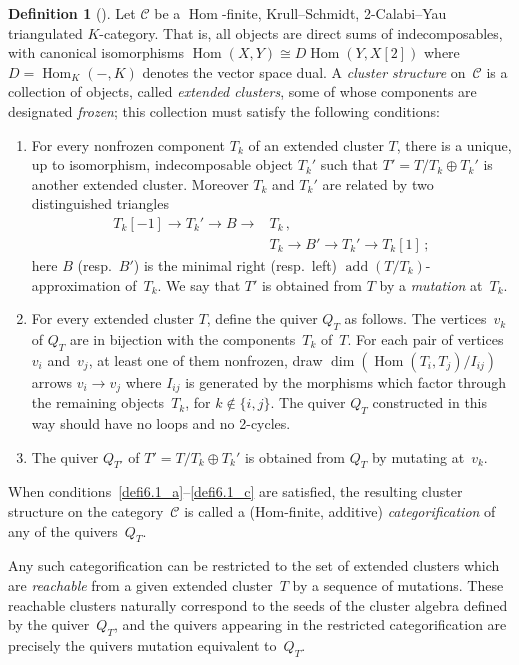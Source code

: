 \documentclass[10pt]{amsart}
\theoremstyle{definition}
\newtheorem{definition}[theorem]{Definition}
\DeclareMathOperator{\Hom}{Hom}
\DeclareMathOperator{\add}{add}
\begin{document}
\begin{definition}[{\cite[Section~II.1]{BIRSc}}]
\label{def:BIRSc}
Let $\mathcal C$ be a $\Hom$-finite, Krull--Schmidt, 2-Calabi--Yau triangulated $K$-category. 
That is, all objects are direct sums of indecomposables, with canonical isomorphisms 
$\Hom(X,Y)\cong D\!\Hom (Y,X[2])$
where $D\!=\!\Hom _K(-,K)$ denotes the vector space dual. 
A \emph{cluster structure} on~$\mathcal C$ is a collection of 
objects, called \emph{extended clusters}, some of whose components are designated \emph{frozen}; this collection must satisfy the following conditions:

\begin{enumerate}[label=(\alph*)]
\item\label{defi6.1_a} 
For every nonfrozen component $T_k$ of an extended cluster $T$, there is a unique, up to isomorphism, indecomposable object $T_k'$ such that $T'=T/T_k\oplus T_k'$ is another extended cluster. 
Moreover $T_k$ and $T_k'$ are related by two distinguished triangles
\[
\begin{aligned}
T_k[-1]\to T_k'\to B\to &T_k \,, \\
&T_k\to B'\to T_k'\to T_k[1] \,;
\end{aligned}
\]
here $B$ (resp.~$B'$) is the minimal right (resp.~left) $\add (T/T_k)$-approximation of~$T_k$.
We say that $T'$ is obtained from $T$ by a \emph{mutation} at~$T_k$. 


\item\label{defi6.1_b} 
For every extended cluster $T$, define the quiver $Q_T$ as follows. 
The vertices~$v_k$ of $Q_T$ are in bijection with the components~$T_k$ of~$T$.
For each pair of vertices $v_i$ and~$v_j$, 
at least one of them nonfrozen, 
draw $\dim(\Hom(T_i,T_j)/I_{ij})$ arrows $v_i\to v_j$
where $I_{ij}$ is generated by the morphisms which factor through the remaining objects~$T_k$,
for $k\notin\{i,j\}$. 
The quiver $Q_T$ constructed in this way should have no loops and no 2-cycles. 

\item\label{defi6.1_c} 
The quiver $Q_{T'}$ of $T'=T/T_k\oplus T_k'$ is obtained from $Q_T$ by mutating at~$v_k$.
\end{enumerate}
When conditions~\ref{defi6.1_a}--\ref{defi6.1_c} are satisfied, the resulting cluster structure on the category~$\mathcal{C}$
is called a (Hom-finite, additive) \emph{categorification} of any of the quivers~$Q_T$.

Any such categorification can be restricted to the set of extended clusters which are \emph{reachable} from a given extended cluster~$T$ by a sequence of mutations. 
These reachable clusters naturally correspond to the seeds of the cluster algebra defined by the quiver~$Q_T$, and 
the quivers appearing in the restricted categorification 
are precisely the quivers mutation equivalent to~$Q_T$. 
\end{definition}
\end{document}
